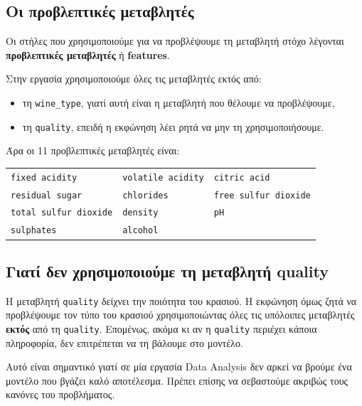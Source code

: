 \documentclass[12pt,a4paper]{article}
\newcommand{\code}[1]{\texttt{\textenglish{#1}}}
\begin{document}
\subsection{Οι προβλεπτικές μεταβλητές}

Οι στήλες που χρησιμοποιούμε για να προβλέψουμε τη μεταβλητή στόχο λέγονται
\textbf{προβλεπτικές μεταβλητές} ή \textbf{features}.

Στην εργασία χρησιμοποιούμε όλες τις μεταβλητές εκτός από:

\begin{itemize}[nosep]
    \item τη \code{wine\_type}, γιατί αυτή είναι η μεταβλητή που θέλουμε να
    προβλέψουμε,
    \item τη \code{quality}, επειδή η εκφώνηση λέει ρητά να μην τη
    χρησιμοποιήσουμε.
\end{itemize}

Άρα οι 11 προβλεπτικές μεταβλητές είναι:

\begin{center}
\footnotesize
\begin{tabular}{lll}
\toprule
\code{fixed acidity} & \code{volatile acidity} & \code{citric acid} \\
\code{residual sugar} & \code{chlorides} & \code{free sulfur dioxide} \\
\code{total sulfur dioxide} & \code{density} & \code{pH} \\
\code{sulphates} & \code{alcohol} & \\
\bottomrule
\end{tabular}
\end{center}

\subsection{Γιατί δεν χρησιμοποιούμε τη μεταβλητή quality}

Η μεταβλητή \code{quality} δείχνει την ποιότητα του κρασιού. Η εκφώνηση όμως
ζητά να προβλέψουμε τον τύπο του κρασιού χρησιμοποιώντας όλες τις υπόλοιπες
μεταβλητές \textbf{εκτός} από τη \code{quality}. Επομένως, ακόμα κι αν η
\code{quality} περιέχει κάποια πληροφορία, δεν επιτρέπεται να τη βάλουμε στο
μοντέλο.

Αυτό είναι σημαντικό γιατί σε μία εργασία Data Analysis δεν αρκεί να βρούμε
ένα μοντέλο που βγάζει καλό αποτέλεσμα. Πρέπει επίσης να σεβαστούμε ακριβώς
τους κανόνες του προβλήματος.

\end{document}
